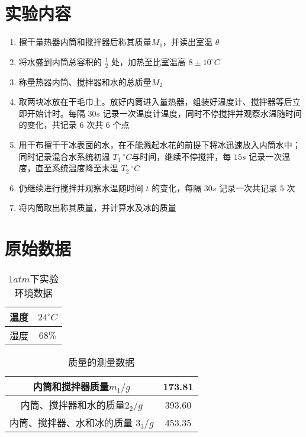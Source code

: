 \documentclass[UTF8]{ctexart}
\title{}
\author{}
\date{}
\begin{document}
\begin{titlepage}		
		
\end{titlepage}


\section{实验内容}
\begin{enumerate}
    \item 擦干量热器内筒和搅拌器后称其质量$M_1$，并读出室温 $\theta$
    \item 将水盛到内筒总容积的 $\frac{1}{2}$ 处，加热至比室温高 $8 \pm 10^{\circ}C$
    \item 称量热器内筒、搅拌器和水的总质量$M_2$ 
    \item 取两块冰放在干毛巾上。放好内筒进入量热器，组装好温度计、搅拌器等后立即开始计时。每隔 $30s$ 记录一次温度计温度，同时不停搅拌并观察水温随时间的变化，共记录 $6$ 次共 $6$ 个点 
    \item 用干布擦干干冰表面的水，在不能溅起水花的前提下将冰迅速放入内筒水中；同时记录混合水系统初温 $T_1 \ ^{\circ}C$与时间，继续不停搅拌，每 $15s$ 记录一次温度，直至系统温度降至末温 $T_2 \ ^{\circ}C$
    \item 仍继续进行搅拌并观察水温随时间 $t$ 的变化，每隔 $30s$ 记录一次共记录 $5$ 次
    \item  将内筒取出称其质量，并计算水及冰的质量
\end{enumerate}

\section{原始数据}

\begin{table}[H]
\centering
\caption{$1atm$下实验环境数据}
\begin{tabular}{|c|c|}
\hline
      温度 & $24^{\circ}C$ \\
\hline
      湿度 & $68\%$ \\
\hline
\end{tabular}
\end{table}


\begin{table}[H]
\centering
\caption{质量的测量数据}
\begin{tabular}{|c|c|}
\hline
      内筒和搅拌器质量$m_1/g$ & 173.81 \\
\hline
      内筒、搅拌器和水的质量$2_2/g$ & 393.60 \\
\hline
      内筒、搅拌器、水和冰的质量 $3_3/g$ & 453.35 \\
\hline
\end{tabular}
\end{table}
\end{document}
